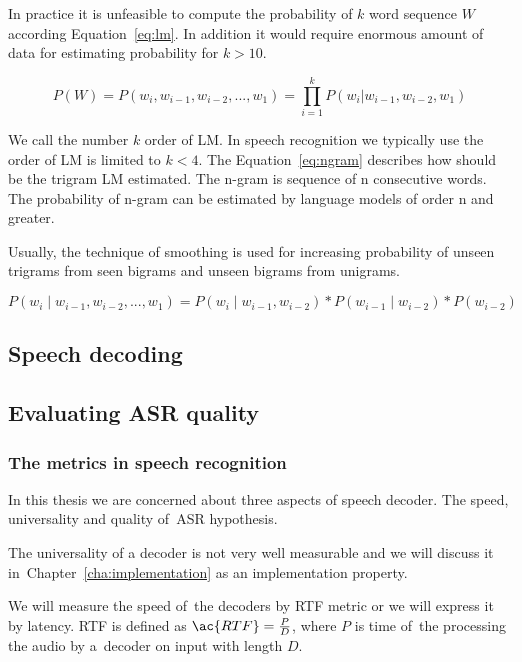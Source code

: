 {In practice it is unfeasible to compute the probability
of $k$ word sequence $W$ according Equation~\ref{eq:lm}.
In addition it would require enormous amount of data for estimating
probability for $k>10$.


\begin{equation} \label{eq:lm}
    P(W)=P(w_i,  w_{i-1}, w_{i-2}, ..., w_1)=\prod_{i=1}^{k}{P(w_i|w_{i-1}, w_{i-2}, w_1)}
\end{equation}

We call the number $k$ order of \ac{LM}.
In speech recognition we typically use the order of \ac{LM} is limited to $k<4$.
The Equation~\ref{eq:ngram} describes how should be the trigram \ac{LM} estimated.
The n-gram is sequence of n consecutive words. The probability of n-gram can be estimated by language models
of order n and greater.

Usually, the technique of smoothing is used for increasing probability of unseen trigrams
from seen bigrams and unseen bigrams from unigrams.

\begin{equation} \label{eq:ngram}
    P(w_i \mid w_{i-1}, w_{i-2}, ..., w_1) = P(w_i \mid w_{i-1}, w_{i-2}) * P(w_{i-1} \mid w_{i-2}) * P(w_{i-2})
\end{equation}

\subsection{Speech decoding}
\label{sub:decode}

\subsection{Evaluating \ac{ASR} quality}
\label{sub:eval}

\subsubsection*{The metrics in speech recognition}
\label{sub:the_metrics_in_speech_recognition}
In this thesis we are concerned about three aspects of speech decoder.
The speed, universality and quality of~\ac{ASR} hypothesis.

The universality of a decoder is not very well measurable and we will discuss it 
in~Chapter~\ref{cha:implementation} as an implementation property.

We will measure the speed of~the decoders by \acl{RTF} metric or we will express it by latency.
\ac{RTF} is defined as $\ac{RTF} = \frac{P}{D}$, where $P$ is time of~the processing the audio by a~decoder on input with length $D$. 

}
